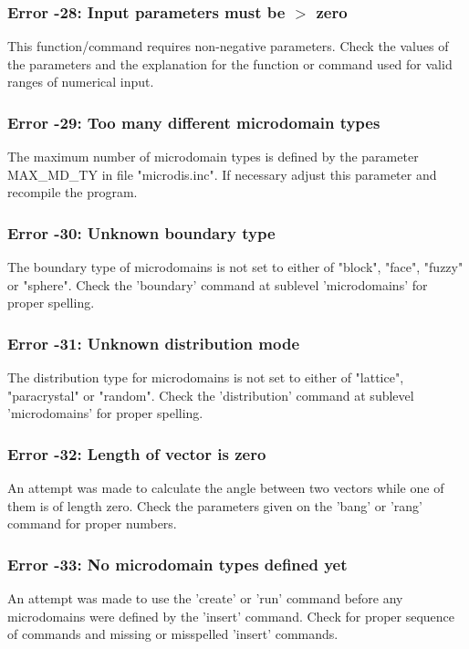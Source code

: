 \subsubsection{Error -28: Input parameters must be $> $ zero}
\par
This function/command requires non-negative parameters. 
Check the values of the parameters and the explanation for the function 
or command used for valid ranges of numerical input. 
\subsubsection{Error -29: Too many different microdomain types}
\par
The maximum number of microdomain types is defined by the parameter 
MAX\_MD\_TY in file "microdis.inc". If necessary adjust this parameter 
and recompile the program. 
\subsubsection{Error -30: Unknown boundary type}
\par
The boundary type of microdomains is not set to either of "block", 
"face", "fuzzy" or "sphere". Check the 'boundary' command at sublevel 
'microdomains' for proper spelling. 
\subsubsection{Error -31: Unknown distribution mode}
\par
The distribution type for microdomains is not set to either of 
"lattice", "paracrystal" or "random". Check the 'distribution' command 
at sublevel 'microdomains' for proper spelling. 
\subsubsection{Error -32: Length of vector is zero}
\par
An attempt was made to calculate the angle between two vectors 
while one of them is of length zero. Check the parameters given 
on the 'bang' or 'rang' command for proper numbers. 
\subsubsection{Error -33: No microdomain types defined yet}
\par
An attempt was made to use the 'create' or 'run' command before 
any microdomains were defined by the 'insert' command. Check for 
proper sequence of commands and missing or misspelled 'insert' commands. 
